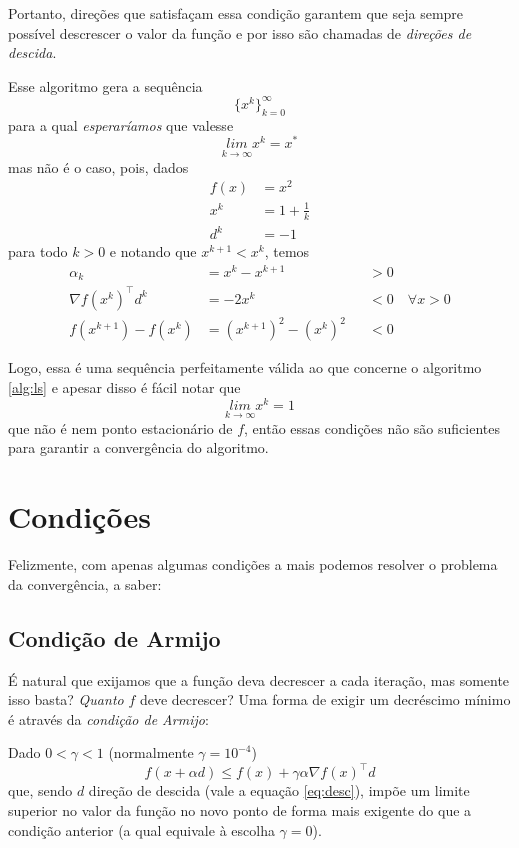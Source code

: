 \documentclass[a4paper,11pt]{article}
\begin{document}
        Portanto, direções que satisfaçam essa condição garantem que seja sempre possível descrescer o valor da função e por isso
        são chamadas de \emph{direções de descida}.

        Esse algoritmo gera a sequência
            $$ \{x^k\}_{k = 0}^\infty $$
        para a qual \emph{esperaríamos} que valesse
            $$ \underset{k \rightarrow \infty}{lim} x^k = x^*$$
        mas não é o caso, pois, dados
            \begin{align*}
                f(x) &= {x}^2 \\
                x^k  &= 1 + \frac{1}{k} \\
                d^k  &= -1
            \end{align*}
        para todo $k > 0$ e notando que $x^{k+1} < x^{k}$, temos
        \begin{align*}
            \alpha_k &= x^k - x^{k+1}  & &> 0 \\
            \nabla f(x^k)^\top d^k &= -2x^k & &< 0 \quad \forall x > 0 \\
            f(x^{k+1}) - f(x^k) &= (x^{k+1})^2 - (x^{k})^2 & &< 0
        \end{align*}

        Logo, essa é uma sequência perfeitamente válida ao que concerne o algoritmo \ref{alg:ls} e apesar disso é fácil notar que
            $$ \underset{k \rightarrow \infty}{lim} x^k = 1$$
        que não é nem ponto estacionário de $f$, então essas condições não são suficientes para garantir a convergência do algoritmo.
    \section*{Condições}
        Felizmente, com apenas algumas condições a mais podemos resolver o problema da convergência, a saber:

        \subsection*{Condição de Armijo}
            É natural que exijamos que a função deva decrescer a cada iteração, mas somente isso basta? \emph{Quanto} $f$
            deve decrescer? Uma forma de exigir um decréscimo mínimo é através da \emph{condição de Armijo}:

            Dado $0 < \gamma < 1$ (normalmente $\gamma = 10^{-4}$)
                $$ f(x + \alpha d) \leq f(x) + \gamma \alpha \nabla f(x)^\top d $$
            que, sendo $d$ direção de descida (vale a equação \ref{eq:desc}), impõe um limite superior no valor da função
            no novo ponto de forma mais exigente do que a condição anterior (a qual equivale à escolha $\gamma = 0$).
\end{document}
